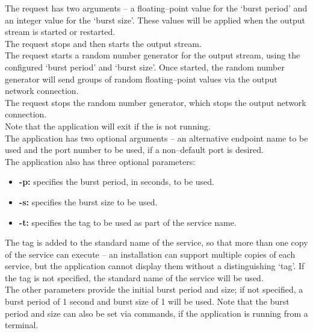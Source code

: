 The  request has two arguments -- a
floating--point value for the `burst period' and an integer value for the `burst size'.
These values will be applied when the output stream is started or restarted.\\

The  request stops and then
starts the output stream.\\

The  request starts a random
number generator for the output stream, using the configured `burst period' and
`burst size'.
Once started, the random number generator will send groups of random floating--point
values via the output \yarp{} network connection.\\

The  request stops the random
number generator, which stops the output \yarp{} network connection.\\ 

Note that the application will exit if the
 is not running.\\

The application has two optional arguments -- an alternative endpoint name to be used and
the port number to be used, if a non--default port is desired.\\

The application also has three optional parameters:
\begin{itemize}
\item \textbf{-p:} specifies the burst period, in seconds, to be used. 
\item \textbf{-s:} specifies the burst size to be used.
\item \textbf{-t:} specifies the tag to be used as part of the service name.
\end{itemize}
The tag is added to the standard name of the service, so that more than one copy of the
service can execute -- an \mplusm{} installation can support multiple copies of each
 service, but the 
application cannot display them without a distinguishing `tag'.
If the tag is not specified, the standard name of the service will be used.\\

The other parameters provide the initial burst period and size; if not specified, a burst
period of 1 second and burst size of 1 will be used.
Note that the burst period and size can also be set via commands, if the application is
running from a terminal.\\

